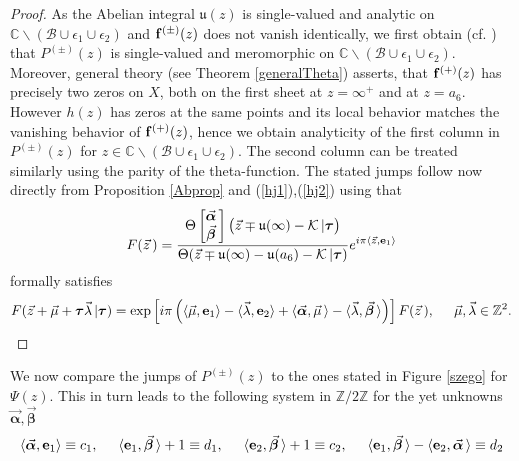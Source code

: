 \documentclass[10pt,oneside,reqno]{amsart}
\numberwithin{equation}{section}
\def\eqref#1{(\ref{#1})}
\begin{document}
\begin{proof}
As the Abelian integral $\mathfrak{u}(z)$ is single-valued and analytic on $\mathbb{C}\backslash(\mathcal{B}\cup\epsilon_1\cup\epsilon_2)$ and ${\bf f}^{(\pm)}(z)$ does not vanish identically, we first obtain
(cf. \cite{FK}) that $P^{(\pm)}(z)$ is single-valued and meromorphic on $\mathbb{C}\backslash(\mathcal{B}\cup\epsilon_1\cup\epsilon_2)$. Moreover, general theory (see Theorem \ref{generalTheta}) asserts, that ${\bf f}^{(+)}(z)$
has precisely two zeros on $X$, both on the first sheet at $z=\infty^+$ and at $z=a_6$. However $h(z)$ has zeros at the same points and its local behavior
matches the vanishing behavior of ${\bf f}^{(+)}(z)$, hence we obtain analyticity of the first column in $P^{(\pm)}(z)$ for $z\in\mathbb{C}\backslash(\mathcal{B}\cup\epsilon_1\cup\epsilon_2)$.
The second column can be treated similarly using the parity of the theta-function. The stated jumps follow now directly from Proposition \ref{Abprop} and \eqref{hj1},\eqref{hj2} using that
\begin{equation*}
  F(\vec{z}\,) = \frac{\Theta\begin{bmatrix}
         \vec{\boldsymbol \alpha}\,\\
\vec{\boldsymbol \beta}\,
        \end{bmatrix}\big(\vec{z}\mp\mathfrak{u}(\infty)-\mathcal{K}\,|{\boldsymbol \tau}\big)}{\Theta(\vec{z}\mp\mathfrak{u}(\infty)-\mathfrak{u}(a_6)-\mathcal{K}\,|{\boldsymbol \tau})}
e^{i\pi \langle\vec{z},{\bf e}_1\rangle}
\end{equation*}
formally satisfies
\begin{equation*}
  F(\vec{z}+\vec{\mu}+{\boldsymbol \tau}\vec{\lambda}\,|{\boldsymbol \tau}) = \exp\left[i\pi \left(\langle\vec{\mu},{\bf e}_1\rangle-\langle\vec{\lambda},{\bf e}_2\rangle+\langle\vec{\boldsymbol \alpha},\vec{\mu}\,\rangle-\langle\vec{\lambda},\vec{\boldsymbol \beta}\,\rangle\right)\right]F(\vec{z}\,),
\hspace{0.5cm}\vec{\mu},\vec{\lambda}\in\mathbb{Z}^2.
\end{equation*}
\end{proof}
We now compare the jumps of $P^{(\pm)}(z)$ to the ones stated in Figure \ref{szego} for $\Psi(z)$. This in turn leads to the following system in
 $\mathbb{Z}/2\mathbb{Z}$ for the yet unknowns $\vec{\boldsymbol \alpha},\vec{\boldsymbol \beta}$
\begin{equation*}
 \langle\vec{\boldsymbol \alpha},{\bf e}_1\rangle \equiv c_1,\hspace{0.5cm}\langle{\bf e}_1,\vec{\boldsymbol \beta}\,\rangle+1\equiv d_1,\hspace{0.5cm}\langle{\bf e}_2,\vec{\boldsymbol \beta}\,\rangle+1\equiv c_2,
\hspace{0.5cm}\langle{\bf e}_1,\vec{\boldsymbol \beta}\,\rangle-\langle{\bf e}_2,\vec{\boldsymbol \alpha}\,\rangle \equiv d_2
\end{equation*}
\end{document}
